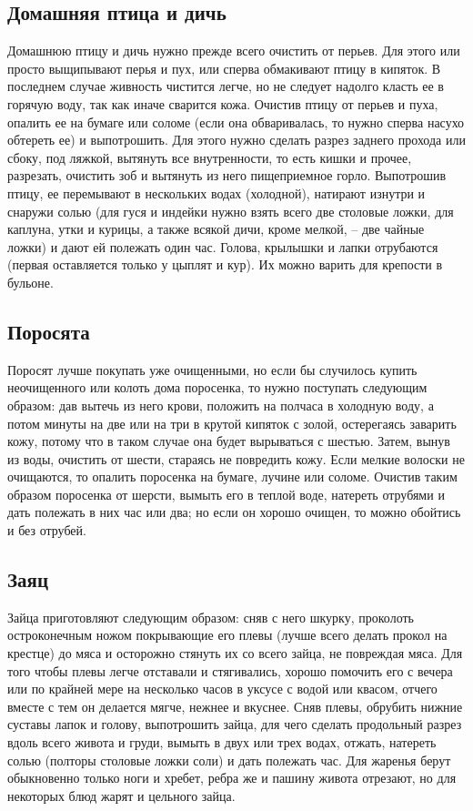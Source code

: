 \subsection{Домашняя птица и дичь}

Домашнюю птицу и дичь нужно прежде всего очистить от перьев. Для этого или просто выщипывают перья и пух, или сперва обмакивают птицу в кипяток. В последнем случае живность чистится легче, но не следует надолго класть ее в горячую воду, так как иначе сварится кожа. Очистив птицу от перьев и пуха, опалить ее на бумаге или соломе (если она обваривалась, то нужно сперва насухо обтереть ее) и выпотрошить. Для этого нужно сделать разрез заднего прохода или сбоку, под ляжкой, вытянуть все внутренности, то есть кишки и прочее, разрезать, очистить зоб и вытянуть из него пищеприемное горло. Выпотрошив птицу, ее перемывают в нескольких водах (холодной), натирают изнутри и снаружи солью (для гуся и индейки нужно взять всего две столовые ложки, для каплуна, утки и курицы, а также всякой дичи, кроме мелкой, – две чайные ложки) и дают ей полежать один час. Голова, крылышки и лапки отрубаются (первая оставляется только у цыплят и кур). Их можно варить для крепости в бульоне.

\subsection{Поросята}

Поросят лучше покупать уже очищенными, но если бы случилось купить неочищенного или колоть дома поросенка, то нужно поступать следующим образом: дав вытечь из него крови, положить на полчаса в холодную воду, а потом минуты на две или на три в крутой кипяток с золой, остерегаясь заварить кожу, потому что в таком случае она будет вырываться с шестью. Затем, вынув из воды, очистить от шести, стараясь не повредить кожу. Если мелкие волоски не очищаются, то опалить поросенка на бумаге, лучине или соломе. Очистив таким образом поросенка от шерсти, вымыть его в теплой воде, натереть отрубями и дать полежать в них час или два; но если он хорошо очищен, то можно обойтись и без отрубей.

\subsection{Заяц}

Зайца приготовляют следующим образом: сняв с него шкурку, проколоть остроконечным ножом покрывающие его плевы (лучше всего делать прокол на крестце) до мяса и осторожно стянуть их со всего зайца, не повреждая мяса. Для того чтобы плевы легче отставали и стягивались, хорошо помочить его с вечера или по крайней мере на несколько часов в уксусе с водой или квасом, отчего вместе с тем он делается мягче, нежнее и вкуснее. Сняв плевы, обрубить нижние суставы лапок и голову, выпотрошить зайца, для чего сделать продольный разрез вдоль всего живота и груди, вымыть в двух или трех водах, отжать, натереть солью (полторы столовые ложки соли) и дать полежать час. Для жаренья берут обыкновенно только ноги и хребет, ребра же и пашину живота отрезают, но для некоторых блюд жарят и цельного зайца.

